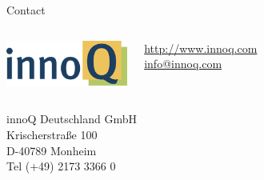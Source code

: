 \documentclass{beamer}
\begin{document}
\begin{frame}{Contact}
  \begin{columns}
    \column{5cm}
    \includegraphics[width=4cm]{images/innoQ-Logo-RGB-72dpi.png}
    \vspace{4mm}
    \column{4.5cm}

    \href{http://www.innoq.com}{http://www.innoq.com} \\
    \href{mailto:info@innoq.com}{info@innoq.com}
  \end{columns}

  innoQ Deutschland GmbH \\
  Krischerstraße 100 \\
  D-40789 Monheim \\
  Tel (+49) 2173 3366 0
\end{frame}
\end{document}
